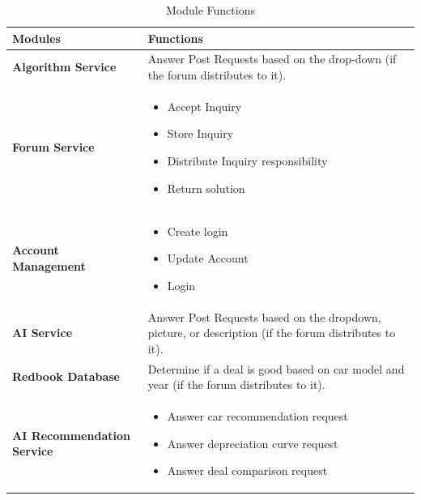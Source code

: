 \documentclass[]{article}
\begin{document}
	\begin{table}[h!]
		\centering
		\renewcommand{\arraystretch}{1.5}
		\begin{tabular}{|p{4cm}|p{10cm}|}
			\hline
			\textbf{Modules} & \textbf{Functions} \\
			\hline
			\textbf{Algorithm Service} & Answer Post Requests based on the drop-down (if the forum distributes to it). \\
			\hline
			\textbf{Forum Service} & 
			\begin{itemize}
				\item Accept Inquiry
				\item Store Inquiry
				\item Distribute Inquiry responsibility
				\item Return solution
			\end{itemize} \\
			\hline
			\textbf{Account Management} & 
			\begin{itemize}
				\item Create login
				\item Update Account
				\item Login
			\end{itemize} \\
			\hline
			\textbf{AI Service} & Answer Post Requests based on the dropdown, picture, or description (if the forum distributes to it). \\
			\hline
			\textbf{Redbook Database} & Determine if a deal is good based on car model and year (if the forum distributes to it). \\
			\hline
			\textbf{AI Recommendation Service} & 
			\begin{itemize}
				\item Answer car recommendation request
				\item Answer depreciation curve request
				\item Answer deal comparison request
			\end{itemize} \\
			\hline
		\end{tabular}
		\caption{Module Functions}
		\label{tab:module_functions}
	\end{table}
        \FloatBarrier
\pagebreak
\end{document}

